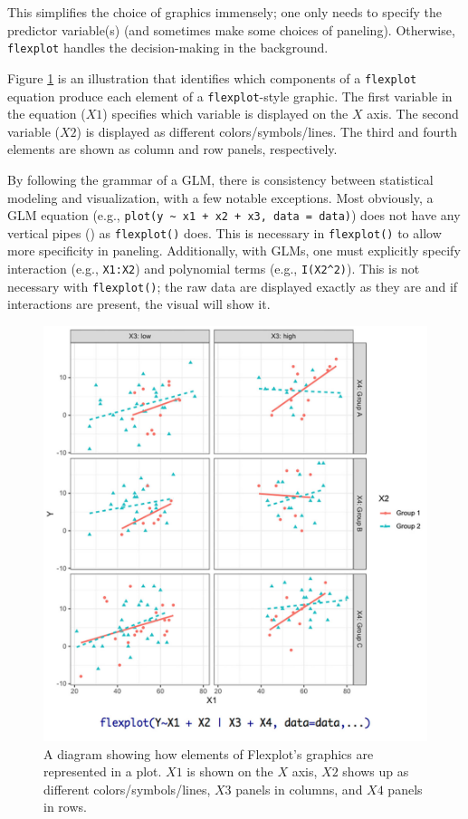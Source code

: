 \documentclass[
  doc]{apa6}
\begin{document}
This simplifies the choice of graphics immensely; one only needs to specify the predictor variable(s) (and sometimes make some choices of paneling). Otherwise, \texttt{flexplot} handles the decision-making in the background.

Figure \ref{fig:flexplotgrammar} is an illustration that identifies which components of a \texttt{flexplot} equation produce each element of a \texttt{flexplot}-style graphic. The first variable in the equation (\(X1\)) specifies which variable is displayed on the \(X\) axis. The second variable (\(X2\)) is displayed as different colors/symbols/lines. The third and fourth elements are shown as column and row panels, respectively.

By following the grammar of a GLM, there is consistency between statistical modeling and visualization, with a few notable exceptions. Most obviously, a GLM equation (e.g., \texttt{plot(y\ \textasciitilde{}\ x1\ +\ x2\ +\ x3,\ data\ =\ data)}) does not have any vertical pipes (\texttt{\textbar{}}) as \texttt{flexplot()} does. This is necessary in \texttt{flexplot()} to allow more specificity in paneling. Additionally, with GLMs, one must explicitly specify interaction (e.g., \texttt{X1:X2}) and polynomial terms (e.g., \texttt{I(X2\^{}2)}). This is not necessary with \texttt{flexplot()}; the raw data are displayed exactly as they are and if interactions are present, the visual will show it.

\begin{figure}
\centering
\includegraphics{images/flexplot_diagram.jpg}
\caption{A diagram showing how elements of Flexplot's graphics are represented in a plot. $X1$ is shown on the $X$ axis, $X2$ shows up as different colors/symbols/lines, $X3$ panels in columns, and $X4$ panels in rows.}
\label{fig:flexplotgrammar}
\end{figure}
\end{document}
